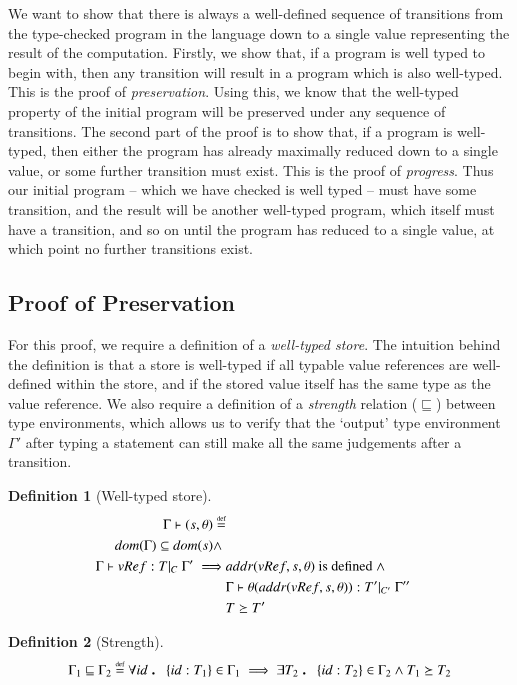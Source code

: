 \documentclass[12pt,a4paper,twoside,openright]{report}
\theoremstyle{definition}
\newtheorem{definition}{Definition}[section]
\theoremstyle{dotless}
\newcommand\eqdef{\mathrel{\overset{\makebox[0pt]{\mbox{\normalfont\tiny def}}}{=}}}
\newcommand\qdot{\mathbin{\scalebox{1.5}{.}}\enspace}
\begin{document}
We want to show that there is always a well-defined sequence of transitions
from the type-checked program in the language down to a single value
representing the result of the computation. Firstly, we show that, if a program
is well typed to begin with, then any transition will result in a program which
is also well-typed. This is the proof of \textit{preservation}.  Using this, we
know that the well-typed property of the initial program will be preserved
under any sequence of transitions. The second part of the proof is to show
that, if a program is well-typed, then either the program has already maximally
reduced down to a single value, or some further transition must exist. This is
the proof of \textit{progress}. Thus our initial program -- which we have
checked is well typed -- must have some transition, and the result will be
another well-typed program, which itself must have a transition, and so on
until the program has reduced to a single value, at which point no further
transitions exist.

\subsection{Proof of Preservation}

For this proof, we require a definition of a \textit{well-typed store}.  The
intuition behind the definition is that a store is well-typed if all typable
value references are well-defined within the store, and if the stored value
itself has the same type as the value reference. We also require a definition
of a \textit{strength} relation ($\sqsubseteq$) between type environments,
which allows us to verify that the `output' type environment $\Gamma'$ after
typing a statement can still make all the same judgements after a transition.

\begin{definition}[Well-typed store]
  \begin{equation} \label{eqn:typed-store}
  	\begin{split}
  	\Gamma\vdash(s,\theta)\eqdef \\
  	  dom(\Gamma) \subseteq dom(s) \land\ & \\
  	  \Gamma \vdash vRef:T|_C\ \Gamma' \implies & addr(vRef,s, \theta)\textrm{ is defined}\ \land \\
  	  & \Gamma\vdash\theta(addr(vRef,s,\theta)):T'|_{C'}\ \Gamma'' \\
	  & T\succeq T'
  	\end{split}
  \end{equation}
\end{definition}
\begin{definition}[Strength]
  \begin{equation} \label{eqn:strength}
	\Gamma_1 \sqsubseteq \Gamma_2 \eqdef 
	\forall id\qdot \{id:T_1\}\in\Gamma_1 \implies \exists T_2 \qdot \{id:T_2\}\in\Gamma_2 \land T_1\succeq T_2
  \end{equation}
\end{definition}
\end{document}
